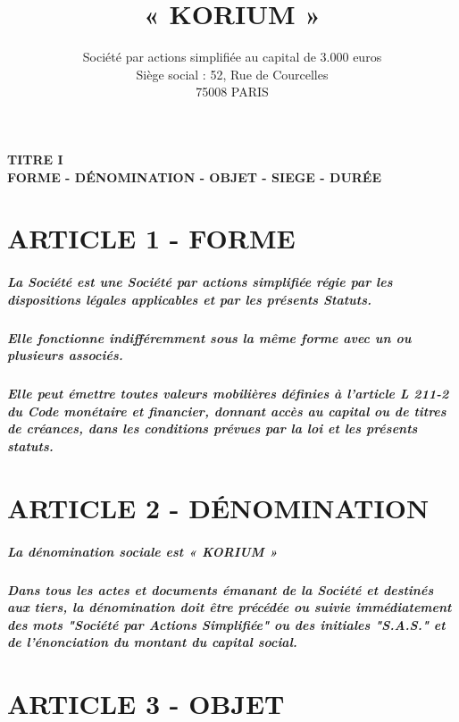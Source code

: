 \documentclass[a4paper, 11pt]{article}
\begin{document}
\title{« KORIUM »}
\author{
  Société par actions simplifiée au capital de 3.000 euros\\
  Siège social : 52, Rue de Courcelles\\
  75008 PARIS\\
}
\date{}

\maketitle

\pagebreak

\paragraph{
  TITRE I\\
  FORME - DÉNOMINATION - OBJET - SIEGE - DURÉE
}

\section*{ARTICLE 1 - FORME}

\subparagraph{
  La Société est une Société par actions simplifiée régie par les dispositions  légales applicables et par les présents Statuts.
}

\subparagraph{
  Elle fonctionne indifféremment sous la même forme avec un ou plusieurs associés.
}

\subparagraph{
  Elle peut émettre toutes valeurs mobilières définies à l'article L 211-2 du Code monétaire et financier, donnant accès au capital ou de titres de créances, dans les conditions prévues par la loi et les présents statuts.
}

\section*{ARTICLE 2 - DÉNOMINATION}

\subparagraph{
  La dénomination sociale est « KORIUM »
}

\subparagraph{
  Dans tous les actes et documents émanant de la Société et destinés aux tiers, la dénomination doit être précédée ou suivie immédiatement des mots "Société par Actions Simplifiée" ou des initiales "S.A.S." et de l'énonciation du montant du capital social.
}

\section*{ARTICLE 3 - OBJET}
\end{document}
